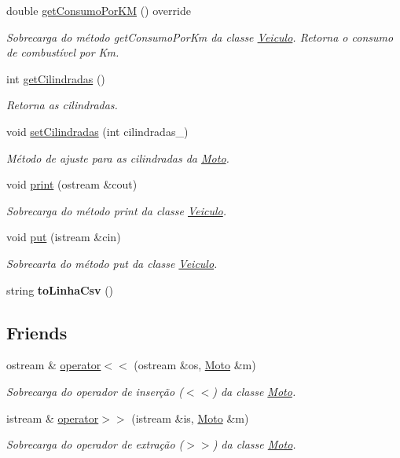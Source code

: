 \begin{DoxyCompactItemize}
double \hyperlink{classMoto_ab352f37ae3e8f056f177ea64723dabf9}{get\+Consumo\+Por\+KM} () override
\begin{DoxyCompactList}\small\item\em Sobrecarga do método get\+Consumo\+Por\+Km da classe \hyperlink{classVeiculo}{Veiculo}. Retorna o consumo de combustível por Km. \end{DoxyCompactList}\item 
int \hyperlink{classMoto_a2161224a091483389bbd25323b7f25e1}{get\+Cilindradas} ()
\begin{DoxyCompactList}\small\item\em Retorna as cilindradas. \end{DoxyCompactList}\item 
void \hyperlink{classMoto_a41e3197a2e7ce5e3485b9cd817cb5b41}{set\+Cilindradas} (int cilindradas\+\_\+)
\begin{DoxyCompactList}\small\item\em Método de ajuste para as cilindradas da \hyperlink{classMoto}{Moto}. \end{DoxyCompactList}\item 
void \hyperlink{classMoto_a5e1247fc0aa0b19054e2a059d4d413ec}{print} (ostream \&cout)
\begin{DoxyCompactList}\small\item\em Sobrecarga do método print da classe \hyperlink{classVeiculo}{Veiculo}. \end{DoxyCompactList}\item 
void \hyperlink{classMoto_a95bb5d4dd623c9c4ad7fa1f219086ca8}{put} (istream \&cin)
\begin{DoxyCompactList}\small\item\em Sobrecarta do método put da classe \hyperlink{classVeiculo}{Veiculo}. \end{DoxyCompactList}\item 
\mbox{\label{classMoto_a0d3390fee0b073d66c3cfbd91fbc867a}} 
string {\bfseries to\+Linha\+Csv} ()
\end{DoxyCompactItemize}
\subsection*{Friends}
\begin{DoxyCompactItemize}
\item 
ostream \& \hyperlink{classMoto_a892a6e71f09bb2e6b752bf12a72bbdc2}{operator$<$$<$} (ostream \&os, \hyperlink{classMoto}{Moto} \&m)
\begin{DoxyCompactList}\small\item\em Sobrecarga do operador de inserção ($<$$<$) da classe \hyperlink{classMoto}{Moto}. \end{DoxyCompactList}\item 
istream \& \hyperlink{classMoto_ad3715e85f4df49a0e667ba8688afd7cd}{operator$>$$>$} (istream \&is, \hyperlink{classMoto}{Moto} \&m)
\begin{DoxyCompactList}\small\item\em Sobrecarga do operador de extração ($>$$>$) da classe \hyperlink{classMoto}{Moto}. \end{DoxyCompactList}\end{DoxyCompactItemize}
